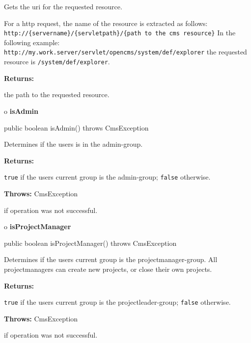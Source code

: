 \begin{description}
\htmlDD Gets the uri for the requested resource. 

For a http request, the name of the resource is extracted as follows:\htmlBR
{\tt http://\{servername\}/\{servletpath\}/\{path to the cms
resource\}}\htmlBR
In the following example:\htmlBR
{\tt http://my.work.server/servlet/opencms/system/def/explorer}\htmlBR
the requested resource is {\tt /system/def/explorer}. 

\begin{description}
\item {\bf Returns:}  

the path to the requested resource.  
\end{description}

\end{description}

o {\bf isAdmin} 

\begin{PRE}
 public boolean isAdmin() throws CmsException
\end{PRE}

\begin{description}
\htmlDD Determines if the users is in the admin-group. 

\begin{description}
\item {\bf Returns:}  

{\tt true} if the users current group is the admin-group; {\tt false}
otherwise.  
\item {\bf Throws:} CmsException  

if operation was not successful.  
\end{description}

\end{description}

o {\bf isProjectManager} 

\begin{PRE}
 public boolean isProjectManager() throws CmsException
\end{PRE}

\begin{description}
\htmlDD Determines if the users current group is the projectmanager-group.
\htmlBR
All projectmanagers can create new projects, or close their own projects. 

\begin{description}
\item {\bf Returns:}  

{\tt true} if the users current group is the projectleader-group; {\tt false}
otherwise.  
\item {\bf Throws:} CmsException  

if operation was not successful.  
\end{description}

\end{description}

